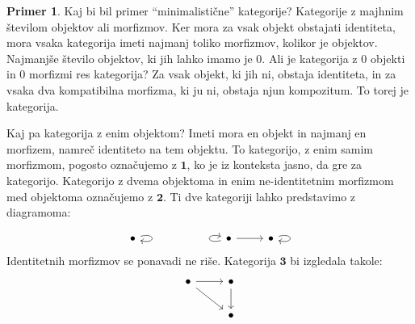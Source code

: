\documentclass[12pt,a4paper]{book}
\theoremstyle{definition}
\theoremstyle{plain}
\theoremstyle{definition}
\newtheorem{primer}{Primer}[section]
\theoremstyle{remark}
\newcommand{\cat}[1]{\textbf{#1}}
\begin{document}
\begin{primer}
Kaj bi bil primer "`minimalistične"' kategorije? Kategorije z majhnim številom objektov ali morfizmov. Ker mora za vsak objekt obstajati identiteta, mora vsaka kategorija imeti najmanj toliko morfizmov, kolikor je objektov. Najmanjše število objektov, ki jih lahko imamo je 0. Ali je kategorija z 0 objekti in 0 morfizmi res kategorija? Za vsak objekt, ki jih ni, obstaja identiteta, in za vsaka dva kompatibilna morfizma, ki ju ni, obstaja njun kompozitum. To torej je kategorija. 

Kaj pa kategorija z enim objektom? Imeti mora en objekt in najmanj en morfizem, namreč identiteto na tem objektu. To kategorijo, z enim samim morfizmom, pogosto označujemo z $\mathbf{1}$, ko je iz konteksta jasno, da gre za kategorijo. Kategorijo z dvema objektoma in enim ne-identitetnim morfizmom med objektoma označujemo z $\mathbf{2}$. Ti dve kategoriji lahko predstavimo z diagramoma:

\begin{equation}
\begin{tikzcd}
\bullet \arrow[loop right] &&&  \arrow[loop left] \bullet \arrow[r] & \bullet \arrow[loop right]
\end{tikzcd}
\end{equation}
%
Identitetnih morfizmov se ponavadi ne riše. Kategorija $\cat{3}$ bi izgledala takole:
%
\begin{equation}
\begin{tikzcd}
\bullet \arrow[r] \arrow[rd] & \bullet \arrow[d] \\
& \bullet
\end{tikzcd}
\end{equation}
\end{primer}
\end{document}
